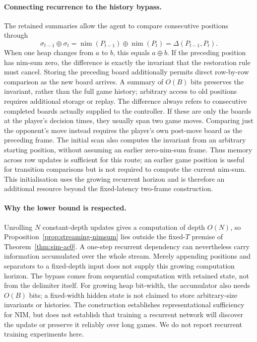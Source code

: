 \documentclass[twoside,11pt]{article}
\numberwithin{theorem}{section}
\numberwithin{equation}{section}
\begin{document}
\paragraph{Connecting recurrence to the history bypass.}
The retained summaries allow the agent to compare consecutive positions through
\[
\sigma_{t-1}\oplus\sigma_t
=\operatorname{nim}(P_{t-1})\oplus\operatorname{nim}(P_t)
=\Delta(P_{t-1},P_t).
\]
When one heap changes from $a$ to $b$, this equals $a\oplus b$. If the preceding position has nim-sum zero, the difference is exactly the invariant that the restoration rule must cancel. Storing the preceding board additionally permits direct row-by-row comparison as the new board arrives. A summary of $O(B)$ bits preserves the invariant, rather than the full game history; arbitrary access to old positions requires additional storage or replay. The difference always refers to consecutive completed boards actually supplied to the controller. If these are only the boards at the player's decision times, they usually span two game moves. Comparing just the opponent's move instead requires the player's own post-move board as the preceding frame.
The initial scan also computes the invariant from an arbitrary starting position, without assuming an earlier zero-nim-sum frame. Thus memory across row updates is sufficient for this route; an earlier game position is useful for transition comparisons but is not required to compute the current nim-sum. This initialisation uses the growing recurrent horizon and is therefore an additional resource beyond the fixed-latency two-frame construction.

\paragraph{Why the lower bound is respected.}
Unrolling $N$ constant-depth updates gives a computation of depth $O(N)$, so Proposition~\ref{prop:streaming-nimsum} lies outside the fixed-$T$ premise of Theorem~\ref{thm:sim-ac0}. A one-step recurrent dependency can nevertheless carry information accumulated over the whole stream. Merely appending positions and separators to a fixed-depth input does not supply this growing computation horizon. The bypass comes from sequential computation with retained state, not from the delimiter itself.
For growing heap bit-width, the accumulator also needs $O(B)$ bits; a fixed-width hidden state is not claimed to store arbitrary-size invariants or histories. The construction establishes representational sufficiency for NIM, but does not establish that training a recurrent network will discover the update or preserve it reliably over long games. We do not report recurrent training experiments here.
\end{document}
